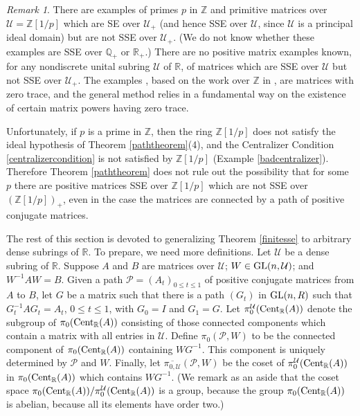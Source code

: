 \documentclass{amsart}
\theoremstyle{definition}
\theoremstyle{remark}
\newtheorem{remark}[theorem]{Remark}
\numberwithin{equation}{section}
\begin{document}
{{\begin{remark}\label{z1overpremark}
There are examples \cite[Appendix E]{B} 
of primes $p$ in $\mathbb Z$ and 
primitive matrices over 
$\mathcal U= \mathbb Z[1/p]$ which are SE over 
$\mathcal U_+$ (and hence SSE over $\mathcal U$, since 
$\mathcal U$ is a principal ideal domain) 
but are not SSE over $\mathcal U_+$. 
(We do not know whether these examples are SSE over $\mathbb Q_+$ 
or $\mathbb R_+$.) 
 There are no positive 
matrix 
examples known, for any nondiscrete unital subring $\mathcal U$ 
of $\mathbb R$, of matrices which are SSE over $\mathcal 
 U$ but not 
SSE over $\mathcal U_+$. 
The examples \cite[Appendix E]{B}, 
based on the work over $\mathbb Z$ in 
\cite{KR6}, are matrices with zero trace, and the 
general method relies in a fundamental way on 
 the existence 
of certain matrix powers having zero trace.

Unfortunately, if 
 $p$ is a prime in $\mathbb Z$, then 
the ring $\mathbb Z[1/p]$ does not satisfy 
the ideal hypothesis
of Theorem \ref{paththeorem}(4), and the 
Centralizer Condition \ref{centralizercondition} is not satisfied by 
$\mathbb Z[1/p]$  (Example \ref{badcentralizer}). 
Therefore Theorem \ref{paththeorem} does not 
rule out the possibility that for some $p$ there are positive 
matrices SSE over 
$\mathbb Z[1/p]$ 
which are not SSE over 
$(\mathbb Z[1/p])_+$, even in the case the matrices are connected by 
a path of positive conjugate matrices. 
\end{remark} 

The rest of this section is devoted to generalizing Theorem 
\ref{finitesse} to arbitrary dense subrings of $\mathbb R$. 
To prepare, we need more definitions. 
Let $\mathcal U$ be a dense subring of $\mathbb R$. Suppose $A$ and $B$ 
are matrices over $\mathcal U$;  
$W \in  
\textnormal{GL}(n,\mathcal U)$; and 
$W^{-1}AW=B$. 
Given a path $\mathcal P=(A_t)_{0\leq t \leq 1}$ 
of positive conjugate matrices from $A$ to $B$, 
let $G$ be a matrix such that there is a path 
$(G_{t})$ in $\textnormal{GL}(n,R)$  such that 
$G_{t}^{-1}AG_{t}=A_t$, $0\leq t \leq 1$, 
with 
$G_{0}=I$ 
 and $G_{1}=G$. 
Let 
$\pi_0^{\mathcal U}({\textnormal{Cent}_{\mathbb R}(A)})$ denote the subgroup of 
$\pi_0({\textnormal{Cent}_{\mathbb R}(A)})$ consisting of those connected components which contain 
a matrix with all entries in $\mathcal U$.
Define 
$\pi_0(\mathcal P,W)$ to be the connected component of 
 $\pi_0({\textnormal{Cent}_{\mathbb R}(A)})$ containing $WG^{-1}$. This component is uniquely 
determined by $\mathcal P$ and $W$. Finally,  
let $\overline{\pi_{0,\mathcal U}}(\mathcal P,W)$ be the coset of 
$\pi_0^{\mathcal U}({\textnormal{Cent}_{\mathbb R}(A)})$
 in 
$\pi_0({\textnormal{Cent}_{\mathbb R}(A)})$ which contains $WG^{-1}$. 
(We remark as an aside that the coset space 
$\pi_0({\textnormal{Cent}_{\mathbb R}(A)})/
\pi_0^{\mathcal U}({\textnormal{Cent}_{\mathbb R}(A)})$ 
is a group, because the group  
$\pi_0({\textnormal{Cent}_{\mathbb R}(A)})$ is abelian, because all its elements 
have order two.)

}}
\end{document}
